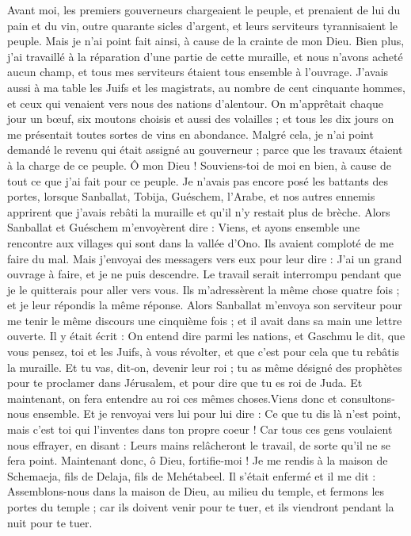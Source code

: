 \begin{multicols}{2}
Avant moi, les premiers gouverneurs chargeaient le peuple, et prenaient de lui du pain et du vin, outre quarante sicles d'argent, et leurs serviteurs tyrannisaient le peuple. Mais je n'ai point fait ainsi, à cause de la crainte de mon Dieu.
Bien plus, j'ai travaillé à la réparation d’une partie de cette muraille, et nous n'avons acheté aucun champ, et tous mes serviteurs étaient tous ensemble à l'ouvrage.
J'avais aussi à ma table les Juifs et les magistrats, au nombre de cent cinquante hommes, et ceux qui venaient vers nous des nations d’alentour.
On m’apprêtait chaque jour un bœuf, six moutons choisis et aussi des volailles ; et tous les dix jours on me présentait toutes sortes de vins en abondance. Malgré cela, je n'ai point demandé le revenu qui était assigné au gouverneur ; parce que les travaux étaient à la charge de ce peuple.
Ô mon Dieu ! Souviens-toi de moi en bien, à cause de tout ce que j'ai fait pour ce peuple.
\VerseOne{}Je n'avais pas encore posé les battants des portes, lorsque Sanballat, Tobija, Guéschem, l'Arabe, et nos autres ennemis apprirent que j'avais rebâti la muraille et qu'il n'y restait plus de brèche.
Alors Sanballat et Guéschem m’envoyèrent dire : Viens, et ayons ensemble une rencontre aux villages qui sont dans la vallée d'Ono. Ils avaient comploté de me faire du mal.
Mais j'envoyai des messagers vers eux pour leur dire : J’ai un grand ouvrage à faire, et je ne puis descendre. Le travail serait interrompu pendant que je le quitterais pour aller vers vous.
Ils m'adressèrent la même chose quatre fois ; et je leur répondis la même réponse.
Alors Sanballat m’envoya son serviteur pour me tenir le même discours une cinquième fois ; et il avait dans sa main une lettre ouverte.
Il y était écrit : On entend dire parmi les nations, et Gaschmu le dit, que vous pensez, toi et les Juifs, à vous révolter, et que c'est pour cela que tu rebâtis la muraille. Et tu vas, dit-on, devenir leur roi ;
tu as même désigné des prophètes pour te proclamer dans Jérusalem, et pour dire que tu es roi de Juda. Et maintenant, on fera entendre au roi ces mêmes choses.Viens donc et consultons-nous ensemble.
Et je renvoyai vers lui pour lui dire : Ce que tu dis là n'est point, mais c'est toi qui l'inventes dans ton propre coeur !
Car tous ces gens voulaient nous effrayer, en disant : Leurs mains relâcheront le travail, de sorte qu'il ne se fera point. Maintenant donc, ô Dieu, fortifie-moi !
Je me rendis à la maison de Schemaeja, fils de Delaja, fils de Mehétabeel. Il s'était enfermé et il me dit : Assemblons-nous dans la maison de Dieu, au milieu du temple, et fermons les portes du temple ; car ils doivent venir pour te tuer, et ils viendront pendant la nuit pour te tuer.

\end{multicols}
